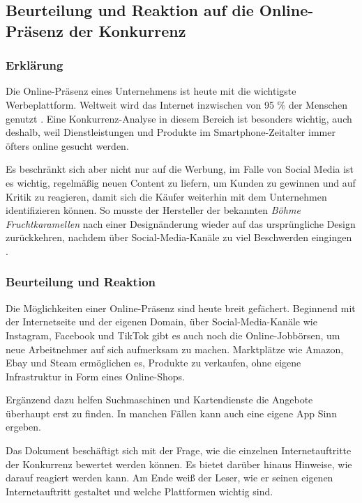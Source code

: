 \subsection{Beurteilung und Reaktion auf die Online-Präsenz der Konkurrenz}

\subsubsection*{Erklärung}

Die Online-Präsenz eines Unternehmens ist heute mit die wichtigste Werbeplattform. Weltweit wird das Internet inzwischen von 95 \% der Menschen genutzt \cite{internetnutzerBU}. Eine Konkurrenz-Analyse in diesem Bereich ist besonders wichtig, auch deshalb, weil Dienstleistungen und Produkte im Smartphone-Zeitalter immer öfters online gesucht werden.

Es beschränkt sich aber nicht nur auf die Werbung, im Falle von Social Media ist es wichtig, regelmäßig neuen Content zu liefern, um Kunden zu gewinnen und auf Kritik zu reagieren, damit sich die Käufer weiterhin mit dem Unternehmen identifizieren können. So musste der Hersteller der bekannten \textit{Böhme Fruchtkaramellen} nach einer Designänderung wieder auf das ursprüngliche Design zurückkehren, nachdem über Social-Media-Kanäle zu viel Beschwerden eingingen \cite{fruchtkaramellenBU}.

\subsubsection*{Beurteilung und Reaktion}

Die Möglichkeiten einer Online-Präsenz sind heute breit gefächert. Beginnend mit der Internetseite und der eigenen Domain, über Social-Media-Kanäle wie Instagram, Facebook und TikTok gibt es auch noch die Online-Jobbörsen, um neue Arbeitnehmer auf sich aufmerksam zu machen. Marktplätze wie Amazon, Ebay und Steam ermöglichen es, Produkte zu verkaufen, ohne eigene Infrastruktur in Form eines Online-Shops.

Ergänzend dazu helfen Suchmaschinen und Kartendienste die Angebote überhaupt erst zu finden. In manchen Fällen kann auch eine eigene App Sinn ergeben.

Das Dokument beschäftigt sich mit der Frage, wie die einzelnen Internetauftritte der Konkurrenz bewertet werden können. Es bietet darüber hinaus Hinweise, wie darauf reagiert werden kann. Am Ende weiß der Leser, wie er seinen eigenen Internetauftritt gestaltet und welche Plattformen wichtig sind.

